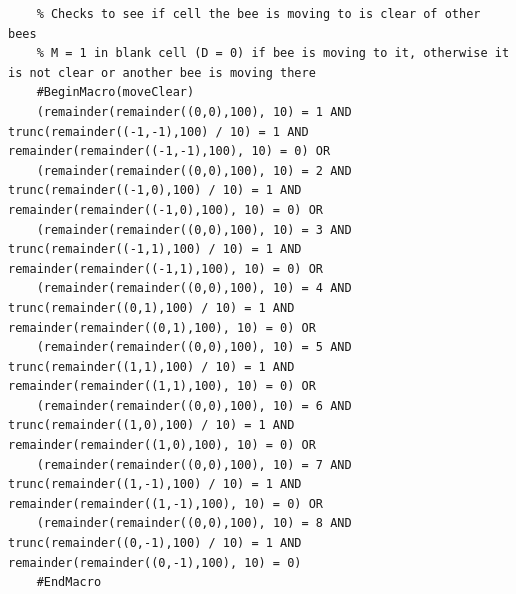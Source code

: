 \documentclass[conference,compsoc,onecolumn]{IEEEtran}
\begin{document}
\begin{lstlisting}
	% Checks to see if cell the bee is moving to is clear of other bees
	% M = 1 in blank cell (D = 0) if bee is moving to it, otherwise it is not clear or another bee is moving there 
	#BeginMacro(moveClear)
	(remainder(remainder((0,0),100), 10) = 1 AND trunc(remainder((-1,-1),100) / 10) = 1 AND remainder(remainder((-1,-1),100), 10) = 0) OR
	(remainder(remainder((0,0),100), 10) = 2 AND trunc(remainder((-1,0),100) / 10) = 1 AND remainder(remainder((-1,0),100), 10) = 0) OR
	(remainder(remainder((0,0),100), 10) = 3 AND trunc(remainder((-1,1),100) / 10) = 1 AND remainder(remainder((-1,1),100), 10) = 0) OR
	(remainder(remainder((0,0),100), 10) = 4 AND trunc(remainder((0,1),100) / 10) = 1 AND remainder(remainder((0,1),100), 10) = 0) OR
	(remainder(remainder((0,0),100), 10) = 5 AND trunc(remainder((1,1),100) / 10) = 1 AND remainder(remainder((1,1),100), 10) = 0) OR
	(remainder(remainder((0,0),100), 10) = 6 AND trunc(remainder((1,0),100) / 10) = 1 AND remainder(remainder((1,0),100), 10) = 0) OR
	(remainder(remainder((0,0),100), 10) = 7 AND trunc(remainder((1,-1),100) / 10) = 1 AND remainder(remainder((1,-1),100), 10) = 0) OR
	(remainder(remainder((0,0),100), 10) = 8 AND trunc(remainder((0,-1),100) / 10) = 1 AND remainder(remainder((0,-1),100), 10) = 0)
	#EndMacro
\end{lstlisting}
\end{document}
